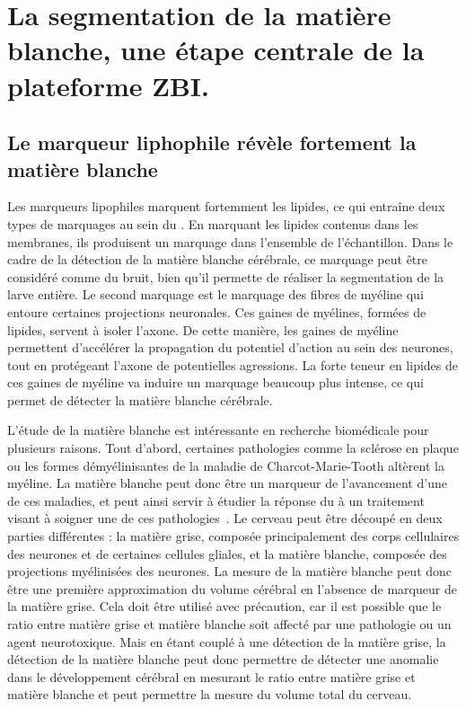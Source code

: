 \documentclass[\main/main.tex]{subfiles}
\begin{document}
\section{\label{sec:algo:white}
La segmentation de la matière blanche, une étape centrale de la plateforme ZBI.
}

\subsection{Le marqueur liphophile révèle fortement la matière blanche}

%
Les marqueurs lipophiles marquent fortemment les lipides, ce qui entraîne deux types de marquages au sein du \pz{}.
%
En marquant les lipides contenus dans les membranes, ils produisent un marquage dans l'ensemble de l'échantillon.
%
Dans le cadre de la détection de la matière blanche cérébrale, ce marquage peut être considéré comme du bruit, bien qu'il permette de réaliser la segmentation de la larve entière.
%
Le second marquage est le marquage des fibres de myéline qui entoure certaines projections neuronales.
%
Ces gaines de myélines, formées de lipides, servent à isoler l'axone.
%
De cette manière, les gaines de myéline  permettent d'accélérer la propagation du potentiel d'action au sein des neurones, tout en protégeant l'axone de potentielles agressions.
%
La forte teneur en lipides de ces gaines de myéline va induire un marquage beaucoup plus intense, ce qui permet de détecter la matière blanche cérébrale.

%
L'étude de la matière blanche est intéressante en recherche biomédicale pour plusieurs raisons.
%
Tout d'abord, certaines pathologies comme la sclérose en plaque ou les formes démyélinisantes de la  maladie de Charcot\hyp{}Marie\hyp{}Tooth altèrent la myéline.
%
La matière blanche peut donc être un marqueur de l'avancement d'une de ces maladies, et peut ainsi servir à étudier la réponse du \pz{} à un traitement visant à soigner une de ces pathologies~\cite{burrows_2019,kulkarni_2017}.
%
Le cerveau peut être découpé en deux parties différentes : la matière grise, composée principalement des corps cellulaires des neurones et de certaines cellules gliales, et la matière blanche, composée des projections myélinisées des neurones.
%
La mesure de la matière blanche peut donc être une première approximation du volume cérébral en l'absence de marqueur de la matière grise.
%
Cela doit être utilisé avec précaution, car il est possible que le ratio entre matière grise et matière blanche soit affecté par une pathologie ou un agent neurotoxique.
%
Mais en étant couplé à une détection de la matière grise, la détection de la matière blanche peut donc permettre de détecter une anomalie dans le développement cérébral en mesurant le ratio entre matière grise et matière blanche et peut permettre la mesure du volume total du cerveau.
\end{document}
